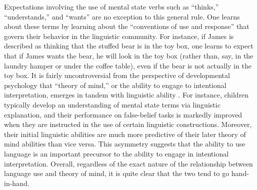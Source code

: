 Expectations involving the use of mental state verbs such as ``thinks,'' ``understands,'' and ``wants'' are no exception to this general rule. One learns about these terms by learning about the ``conventions of use and response'' \citep[][p. 50]{Millikan:2005} that govern their behavior in the linguistic community. For instance, if James is described as  thinking that the stuffed bear is in the toy box, one learns to expect that if James wants the bear, he will look in the toy box (rather than, say, in the laundry hamper or under the coffee table), even if the bear is not actually in the toy box. It is fairly uncontroversial from the perspective of developmental psychology that ``theory of mind,'' or the ability to engage to intentional interpretation, emerges in tandem with linguistic ability \citep{Miller:2006}. For instance, children typically develop an understanding of mental state terms via linguistic explanation, and their performance on false-belief tasks is markedly improved when they are instructed in the use of certain linguistic constructions. Moreover, their initial linguistic abilities are much more predictive of their later theory of mind abilities than vice versa. This asymmetry suggests that the ability to use language is an important precursor to the ability to engage in intentional interpretation. Overall, regardless of the exact nature of the relationship between language use and theory of mind, it is quite clear that the two tend to go hand-in-hand.


